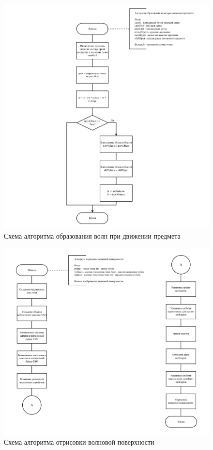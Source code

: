 \begin{figure}[H]
	\begin{center}
		\includegraphics[scale=0.6]{img/alg-wave.pdf}
	\end{center}
	\captionsetup{justification=centering}
	\caption{Схема алгоритма образования волн при движении предмета}
	\label{img:alg-wave}
\end{figure}

\begin{figure}[H]
	\begin{center}
		\includegraphics[scale=0.6]{img/draw-water.pdf}
	\end{center}
	\captionsetup{justification=centering}
	\caption{Схема алгоритма отрисовки волновой поверхности}
	\label{img:draw-water}
\end{figure}

